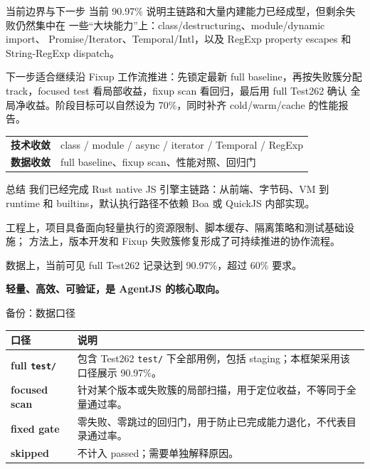 \documentclass[aspectratio=169,UTF8,fontset=windows]{ctexbeamer}
\newcommand{\FullPassRate}{90.97\%}
\begin{document}
\begin{frame}{当前边界与下一步}
  当前 \FullPassRate{} 说明主链路和大量内建能力已经成型，但剩余失败仍然集中在
  一些“大块能力”上：class/destructuring、module/dynamic import、
  Promise/Iterator、Temporal/Intl，以及 RegExp property escapes 和
  String-RegExp dispatch。

  \vspace{0.7em}
  下一步适合继续沿 Fixup 工作流推进：先锁定最新 full baseline，再按失败簇分配
  track，focused test 看局部收益，fixup scan 看回归，最后用 full Test262 确认
  全局净收益。阶段目标可以自然设为 70\%，同时补齐 cold/warm/cache 的性能报告。

  \vspace{0.8em}
  \begin{tabularx}{\textwidth}{>{\bfseries}p{} X}
    \toprule
    技术收敛 & class / module / async / iterator / Temporal / RegExp \\
    数据收敛 & full baseline、fixup scan、性能对照、回归门 \\
    \bottomrule
  \end{tabularx}
\end{frame}

\begin{frame}{总结}
  我们已经完成 Rust native JS 引擎主链路：从前端、字节码、VM 到 runtime 和
  builtins，默认执行路径不依赖 Boa 或 QuickJS 内部实现。

  \vspace{0.5em}
  工程上，项目具备面向轻量执行的资源限制、脚本缓存、隔离策略和测试基础设施；
  方法上，版本开发和 Fixup 失败簇修复形成了可持续推进的协作流程。

  \vspace{0.5em}
  数据上，当前可见 full Test262 记录达到 \FullPassRate{}，超过 60\% 要求。

  \vspace{0.8em}
  \begin{center}
    {\Large\bfseries 轻量、高效、可验证，是 AgentJS 的核心取向。}
  \end{center}
\end{frame}

\appendix

\begin{frame}{备份：数据口径}
  \begin{tabularx}{\textwidth}{>{\bfseries}p{} X}
    \toprule
    口径 & 说明 \\
    \midrule
    full \texttt{test/} & 包含 Test262 \texttt{test/} 下全部用例，包括 staging；本框架采用该口径展示 \FullPassRate{}。 \\
    focused scan & 针对某个版本或失败簇的局部扫描，用于定位收益，不等同于全量通过率。 \\
    fixed gate & 零失败、零跳过的回归门，用于防止已完成能力退化，不代表目录通过率。 \\
    skipped & 不计入 passed；需要单独解释原因。 \\
    \bottomrule
  \end{tabularx}
\end{frame}
\end{document}
